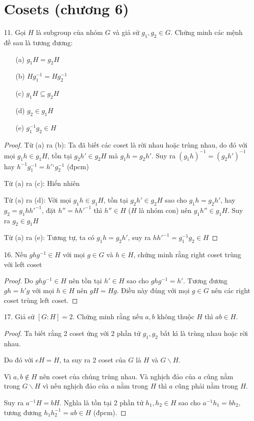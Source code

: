 \section{Cosets (chương 6)}

11. Gọi $H$ là subgroup của nhóm $G$ và giả sử $g_1, g_2 \in G$. Chứng minh các mệnh đề sau là tương đương:

\begin{itemize}
    \item[(a)] $g_1 H = g_2 H$
    \item[(b)] $H g_1^{-1} = H g_2^{-1}$
    \item[(c)] $g_1 H \subseteq g_2 H$
    \item[(d)] $g_2 \in g_1 H$
    \item[(e)] $g_1^{-1} g_2 \in H$ 
\end{itemize}

\begin{proof}
    Từ (a) ra (b): Ta đã biết các coset là rời nhau hoặc trùng nhau, do đó với mọi $g_1 h \in g_1 H$, tồn tại $g_2 h' \in g_2 H$ mà $g_1 h = g_2 h'$. Suy ra $(g_1 h)^{-1} = (g_2 h')^{-1}$ hay $h^{-1} g_1^{-1} = h'^{_1} g_2^{-1}$ (đpcm)

    Từ (a) ra (c): Hiển nhiên

    Từ (a) ra (d): Với mọi $g_1 h \in g_1 H$, tồn tại $g_2 h' \in g_2 H$ sao cho $g_1 h = g_2 h'$, hay $g_2 = g_1 h h'^{-1}$, đặt $h'' = h h'^{-1}$ thì $h'' \in H$ ($H$ là nhóm con) nên $g_1 h'' \in g_1 H$. Suy ra $g_2 \in g_1 H$

    Từ (a) ra (e): Tương tự, ta có $g_1 h = g_2 h'$, suy ra $h h'^{-1}= g_1^{-1} g_2 \in H$

\end{proof}


16. Nếu $g h g^{-1} \in H$ với mọi $g \in G$ và $h \in H$, chứng minh rằng right coset trùng với left coset

\begin{proof}
    Do $g h g^{-1} \in H$ nên tồn tại $h' \in H$ sao cho $g h g^{-1} = h'$. Tương đương $g h = h' g$ với mọi $h \in H$ nên $g H = H g$. Điều này đúng với mọi $g \in G$ nên các right coset trùng left coset.
\end{proof}

17. Giả sử $[G:H]=2$. Chứng minh rằng nếu $a, b$ không thuộc $H$ thì $ab \in H$.

\begin{proof}
    Ta biết rằng 2 coset ứng với 2 phần tử $g_1, g_2$ bất kì là trùng nhau hoặc rời nhau.

    Do đó với $eH = H$, ta suy ra 2 coset của $G$ là $H$ và $G \backslash H$.

    Vì $a, b \not\in H$ nên coset của chúng trùng nhau. Và nghịch đảo của $a$ cũng nằm trong $G \backslash H$ vì nếu nghịch đảo của $a$ nằm trong $H$ thì $a$ cũng phải nằm trong $H$.

    Suy ra $a^{-1} H = b H$. Nghĩa là tồn tại 2 phần tử $h_1, h_2 \in H$ sao cho $a^{-1} h_1 = b h_2$, tương đương $h_1 h_2^{-1} = a b \in H$ (đpcm).
\end{proof}

